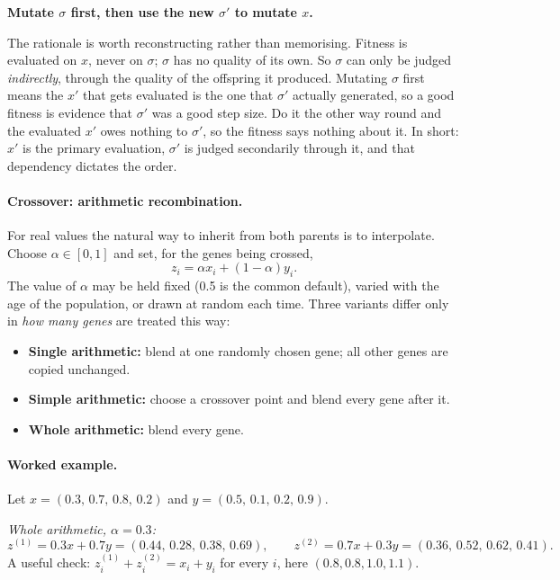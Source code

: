 \documentclass[11pt,a4paper]{article}
\begin{document}
\begin{center}
\textbf{Mutate $\sigma$ first, then use the new $\sigma'$ to mutate $x$.}
\end{center}

The rationale is worth reconstructing rather than memorising. Fitness is
evaluated on $x$, never on $\sigma$; $\sigma$ has no quality of its own. So
$\sigma$ can only be judged \emph{indirectly}, through the quality of the
offspring it produced. Mutating $\sigma$ first means the $x'$ that gets
evaluated is the one that $\sigma'$ actually generated, so a good fitness is
evidence that $\sigma'$ was a good step size. Do it the other way round and
the evaluated $x'$ owes nothing to $\sigma'$, so the fitness says nothing
about it. In short: $x'$ is the primary evaluation, $\sigma'$ is judged
secondarily through it, and that dependency dictates the order.

\paragraph{Crossover: arithmetic recombination.}
For real values the natural way to inherit from both parents is to
interpolate. Choose $\alpha\in[0,1]$ and set, for the genes being crossed,
\[
  z_i=\alpha x_i+(1-\alpha)y_i .
\]
The value of $\alpha$ may be held fixed (0.5 is the common default), varied
with the age of the population, or drawn at random each time. Three variants
differ only in \emph{how many genes} are treated this way:
\begin{itemize}
\item \textbf{Single arithmetic:} blend at one randomly chosen gene; all
      other genes are copied unchanged.
\item \textbf{Simple arithmetic:} choose a crossover point and blend every
      gene after it.
\item \textbf{Whole arithmetic:} blend every gene.
\end{itemize}

\paragraph{Worked example.} Let
$x=(0.3,\,0.7,\,0.8,\,0.2)$ and $y=(0.5,\,0.1,\,0.2,\,0.9)$.

\emph{Whole arithmetic, $\alpha=0.3$:}
\[
  z^{(1)}=0.3x+0.7y=(0.44,\,0.28,\,0.38,\,0.69),\qquad
  z^{(2)}=0.7x+0.3y=(0.36,\,0.52,\,0.62,\,0.41).
\]
A useful check: $z^{(1)}_i+z^{(2)}_i=x_i+y_i$ for every $i$, here
$(0.8,0.8,1.0,1.1)$.
\end{document}
